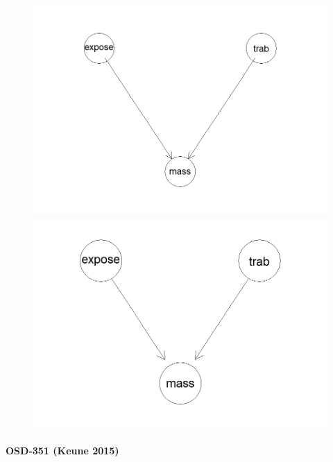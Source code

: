 \documentclass{article}
\begin{document}
\begin{figure}[h]
    \begin{minipage}{0.45\textwidth}
        \centering
        \includegraphics[width=\linewidth]{alwood.png}
    \end{minipage}
    \hfill
    \begin{minipage}{0.45\textwidth}
        \centering
        \includegraphics[width=\linewidth]{c_alwood.png}
    \end{minipage}
\end{figure}
  
\null\newpage




\paragraph{OSD-351 (Keune 2015)}
\end{document}
